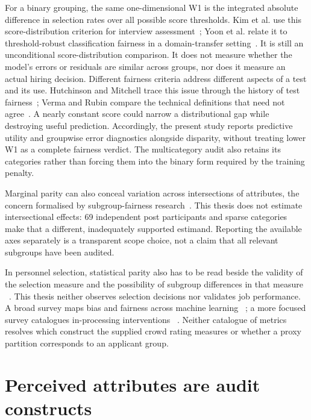 For a binary grouping, the same one-dimensional W1 is the integrated absolute difference in
selection rates over all possible score thresholds. Kim et al. use this score-distribution
criterion for interview assessment~\cite{Kim2023}; Yoon et al. relate it to threshold-robust
classification fairness in a domain-transfer setting~\cite{Yoon2020}. It is still an
unconditional score-distribution comparison. It does not measure whether the model's errors or
residuals are similar across groups, nor does it measure an actual hiring decision. Different
fairness criteria address different aspects of a test and its use. Hutchinson and Mitchell
trace this issue through the history of test fairness~\cite{Hutchinson2019}; Verma and Rubin
compare the technical definitions that need not agree~\cite{Verma2018}. A nearly constant score
could narrow a distributional gap while
destroying useful prediction. Accordingly, the present study reports predictive utility and
groupwise error diagnostics alongside disparity, without treating lower W1 as a complete fairness
verdict. The multicategory audit also retains its categories rather than forcing them into the
binary form required by the training penalty.

Marginal parity can also conceal variation across intersections of attributes, the concern
formalised by subgroup-fairness research~\cite{Kearns2018}. This thesis does not estimate
intersectional effects: 69 independent post participants and sparse categories make that a
different, inadequately supported estimand. Reporting the available axes separately is a
transparent scope choice, not a claim that all relevant subgroups have been audited.

In personnel selection, statistical parity also has to be read beside the validity of the
selection measure and the possibility of subgroup differences in that measure
~\cite{Ployhart2008}. This thesis neither observes selection decisions nor validates job
performance. A broad survey maps bias and fairness across machine learning
~\cite{Mehrabi2021}; a more focused survey catalogues in-processing interventions
~\cite{10.1145/3551390}. Neither catalogue of
metrics resolves which construct the supplied crowd rating measures or whether a proxy partition
corresponds to an applicant group.

\section{Perceived attributes are audit constructs}

